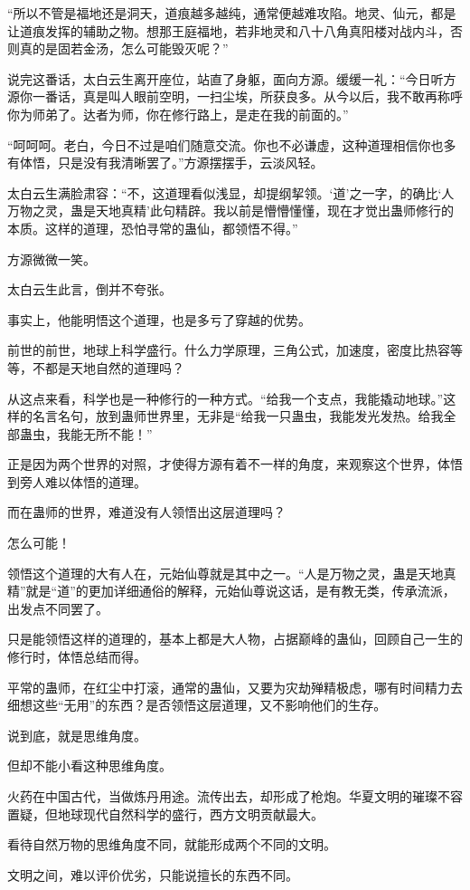 \begin{this_body}
“所以不管是福地还是洞天，道痕越多越纯，通常便越难攻陷。地灵、仙元，都是让道痕发挥的辅助之物。想那王庭福地，若非地灵和八十八角真阳楼对战内斗，否则真的是固若金汤，怎么可能毁灭呢？”

说完这番话，太白云生离开座位，站直了身躯，面向方源。缓缓一礼：“今日听方源你一番话，真是叫人眼前空明，一扫尘埃，所获良多。从今以后，我不敢再称呼你为师弟了。达者为师，你在修行路上，是走在我的前面的。”

“呵呵呵。老白，今日不过是咱们随意交流。你也不必谦虚，这种道理相信你也多有体悟，只是没有我清晰罢了。”方源摆摆手，云淡风轻。

太白云生满脸肃容：“不，这道理看似浅显，却提纲挈领。‘道’之一字，的确比‘人万物之灵，蛊是天地真精’此句精辟。我以前是懵懵懂懂，现在才觉出蛊师修行的本质。这样的道理，恐怕寻常的蛊仙，都领悟不得。”

方源微微一笑。

太白云生此言，倒并不夸张。

事实上，他能明悟这个道理，也是多亏了穿越的优势。

前世的前世，地球上科学盛行。什么力学原理，三角公式，加速度，密度比热容等等，不都是天地自然的道理吗？

从这点来看，科学也是一种修行的一种方式。“给我一个支点，我能撬动地球。”这样的名言名句，放到蛊师世界里，无非是“给我一只蛊虫，我能发光发热。给我全部蛊虫，我能无所不能！”

正是因为两个世界的对照，才使得方源有着不一样的角度，来观察这个世界，体悟到旁人难以体悟的道理。

而在蛊师的世界，难道没有人领悟出这层道理吗？

怎么可能！

领悟这个道理的大有人在，元始仙尊就是其中之一。“人是万物之灵，蛊是天地真精”就是“道”的更加详细通俗的解释，元始仙尊说这话，是有教无类，传承流派，出发点不同罢了。

只是能领悟这样的道理的，基本上都是大人物，占据巅峰的蛊仙，回顾自己一生的修行时，体悟总结而得。

平常的蛊师，在红尘中打滚，通常的蛊仙，又要为灾劫殚精极虑，哪有时间精力去细想这些“无用”的东西？是否领悟这层道理，又不影响他们的生存。

说到底，就是思维角度。

但却不能小看这种思维角度。

火药在中国古代，当做炼丹用途。流传出去，却形成了枪炮。华夏文明的璀璨不容置疑，但地球现代自然科学的盛行，西方文明贡献最大。

看待自然万物的思维角度不同，就能形成两个不同的文明。

文明之间，难以评价优劣，只能说擅长的东西不同。


\end{this_body}
